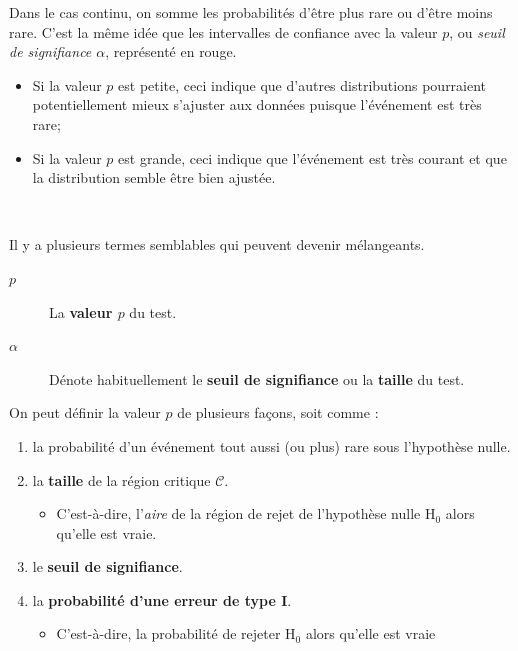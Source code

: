 \documentclass[french]{article}
\begin{document}
\begin{multicols*}{2}
Dans le cas continu, on somme les probabilités d'être plus rare ou d'être moins rare. C'est la même idée que les intervalles de confiance avec la valeur $p$, ou \textit{seuil de signifiance $\alpha$}, représenté en rouge. 
\begin{itemize}
	\item	Si la valeur $p$ est petite, ceci indique que d'autres distributions pourraient potentiellement mieux s'ajuster aux données puisque l'événement est très rare;
	\item	Si la valeur $p$ est grande, ceci indique que l'événement est très courant et que la distribution semble être bien ajustée.
\end{itemize}

\

Il y a plusieurs termes semblables qui peuvent devenir mélangeants.
\begin{distributions}[Terminologie]
\begin{description}
	\item[$p$]	La \textbf{valeur $p$} du test.
	\item[$\alpha$]	Dénote habituellement le \textbf{seuil de signifiance} ou la \textbf{taille} du test.
\end{description}
\end{distributions}

\begin{definitionNOHFILLsub}
On peut définir la valeur $p$ de plusieurs façons, soit comme : 
\begin{enumerate}
	\item	la probabilité d'un événement tout aussi (ou plus) rare sous l'hypothèse nulle.
	\item	la \textbf{taille} de la région critique $\mathcal{C}$.
		\begin{itemize}
		\item	C'est-à-dire, l'\textit{aire} de la région de rejet de l'hypothèse nulle $\text{H}_{0}$ alors qu'elle est vraie.
		\end{itemize}
	\item	le \textbf{seuil de signifiance}.
	\item	la \textbf{probabilité d'une erreur de type I}.
		\begin{itemize}
		\item	 C'est-à-dire, la probabilité de rejeter $\text{H}_{0}$ alors qu'elle est vraie
		\end{itemize}
\end{enumerate}
\end{definitionNOHFILLsub}


\end{multicols*}
\end{document}
